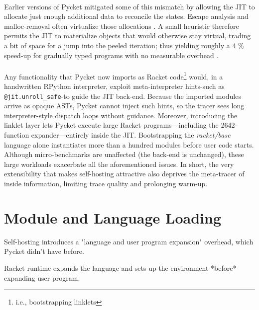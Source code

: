 	\paragraph{}%
		Earlier versions of Pycket mitigated some of this mismatch by allowing the JIT to allocate just enough additional data to reconcile the states. Escape analysis and malloc-removal often virtualize those allocations \cite{malloc-removal:11,loop-aware:12}. A small heuristic therefore permits the JIT to materialize objects that would otherwise stay virtual, trading a bit of space for a jump into the peeled iteration; thus yielding roughly a 4 \% speed-up for gradually typed programs with no measurable overhead \cite{pycketmain2}.

	\paragraph{}%
		Any functionality that Pycket now imports as Racket code\footnote{i.e., bootstrapping linklets} would, in a handwritten RPython interpreter, exploit meta-interpreter hints-such as \verb|@jit.unroll_safe|-to guide the JIT back-end. Because the imported modules arrive as opaque ASTs, Pycket cannot inject such hints, so the tracer sees long interpreter-style dispatch loops without guidance. Moreover, introducing the linklet layer lets Pycket execute large Racket programs—including the 2642-function expander—entirely inside the JIT. Bootstrapping the \emph{racket/base} language alone instantiates more than a hundred modules before user code starts. Although micro-benchmarks are unaffected (the back-end is unchanged), these large workloads exacerbate all the aforementioned issues. In short, the very extensibility that makes self-hosting attractive also deprives the meta-tracer of inside information, limiting trace quality and prolonging warm-up.

	\section{Module and Language Loading}
	\label{section:module-and-language-loading}

		\begin{sectionpoint}
			Self-hosting introduces a "language and user program expansion" overhead, which Pycket didn't have before.
		\end{sectionpoint}

		\begin{paragraph-here}
			Racket runtime expands the language and sets up the environment *before* expanding user program.
		\end{paragraph-here}

